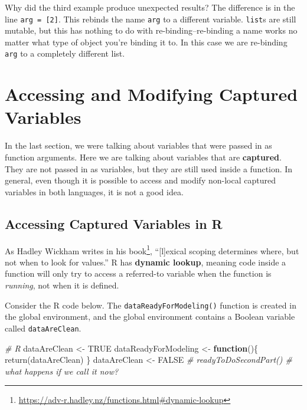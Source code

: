\documentclass[
  12pt,
  krantz2]{krantz}
\makeatletter
\newenvironment{Shaded}{\begin{snugshade}}{\end{snugshade}}
\newcommand{\CommentTok}[1]{\textcolor[rgb]{0.37,0.37,0.37}{\textit{#1}}}
\newcommand{\ConstantTok}[1]{\textcolor[rgb]{0,0,0}{#1}}
\newcommand{\ControlFlowTok}[1]{\textcolor[rgb]{0.27,0.27,0.27}{\textbf{#1}}}
\newcommand{\FunctionTok}[1]{\textcolor[rgb]{0,0,0}{#1}}
\newcommand{\NormalTok}[1]{#1}
\newcommand{\OtherTok}[1]{\textcolor[rgb]{0.37,0.37,0.37}{#1}}
\renewcommand{\href}[2]{#2\footnote{\url{#1}}}
\newenvironment{kframe}{%
\medskip{}
\setlength{\fboxsep}{.8em}
 \def\at@end@of@kframe{}%
 \ifinner\ifhmode%
  \def\at@end@of@kframe{\end{minipage}}%
  \begin{minipage}{\columnwidth}%
 \fi\fi%
 \def\FrameCommand##1{\hskip\@totalleftmargin \hskip-\fboxsep
 \colorbox{shadecolor}{##1}\hskip-\fboxsep
     \hskip-\linewidth \hskip-\@totalleftmargin \hskip\columnwidth}%
 \MakeFramed {\advance\hsize-\width
   \@totalleftmargin\z@ \linewidth\hsize
   \@setminipage}}%
 {\par\unskip\endMakeFramed%
 \at@end@of@kframe}
\renewenvironment{Shaded}{\begin{kframe}}{\end{kframe}}
\makeatother
\begin{document}
Why did the third example produce unexpected results? The difference is in the line \texttt{arg\ =\ {[}2{]}}. This rebinds the name \texttt{arg} to a different variable. \texttt{list}s are still mutable, but this has nothing to do with re-binding--re-binding a name works no matter what type of object you're binding it to. In this case we are re-binding \texttt{arg} to a completely different list.

\hypertarget{accessing-and-modifying-captured-variables}{%
\section{Accessing and Modifying Captured Variables}\label{accessing-and-modifying-captured-variables}}

In the last section, we were talking about variables that were passed in as function arguments. Here we are talking about variables that are \textbf{captured}. They are not passed in as variables, but they are still used inside a function. In general, even though it is possible to access and modify non-local captured variables in both languages, it is not a good idea.

\hypertarget{accessing-captured-variables-in-r}{%
\subsection{Accessing Captured Variables in R}\label{accessing-captured-variables-in-r}}

As Hadley Wickham writes in \href{https://adv-r.hadley.nz/functions.html\#dynamic-lookup}{his book}, ``{[}l{]}exical scoping determines where, but not when to look for values.'' R has \textbf{dynamic lookup}, meaning code inside a function will only try to access a referred-to variable when the function is \emph{running}, not when it is defined.

Consider the R code below. The \texttt{dataReadyForModeling()} function is created in the global environment, and the global environment contains a Boolean variable called \texttt{dataAreClean}.

\begin{Shaded}
\begin{Highlighting}[]
\CommentTok{\# R}
\NormalTok{dataAreClean }\OtherTok{\textless{}{-}} \ConstantTok{TRUE}
\NormalTok{dataReadyForModeling }\OtherTok{\textless{}{-}} \ControlFlowTok{function}\NormalTok{()\{}
  \FunctionTok{return}\NormalTok{(dataAreClean)}
\NormalTok{\}}
\NormalTok{dataAreClean }\OtherTok{\textless{}{-}} \ConstantTok{FALSE}
\CommentTok{\# readyToDoSecondPart() \# what happens if we call it now?}
\end{Highlighting}
\end{Shaded}
\end{document}
